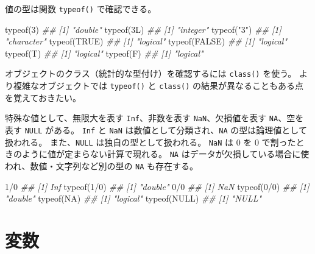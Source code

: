 \documentclass[
  letterpaper,
  xelatex,
  ja=standard, xelatex]{bxjsbook}
\newenvironment{Shaded}{\begin{snugshade}}{\end{snugshade}}
\newcommand{\ConstantTok}[1]{\textcolor[rgb]{0.56,0.35,0.01}{#1}}
\newcommand{\DecValTok}[1]{\textcolor[rgb]{0.68,0.00,0.00}{#1}}
\newcommand{\DocumentationTok}[1]{\textcolor[rgb]{0.37,0.37,0.37}{\textit{#1}}}
\newcommand{\FunctionTok}[1]{\textcolor[rgb]{0.28,0.35,0.67}{#1}}
\newcommand{\NormalTok}[1]{\textcolor[rgb]{0.00,0.23,0.31}{#1}}
\newcommand{\SpecialCharTok}[1]{\textcolor[rgb]{0.37,0.37,0.37}{#1}}
\newcommand{\StringTok}[1]{\textcolor[rgb]{0.13,0.47,0.30}{#1}}
\begin{document}
値の型は関数 \texttt{typeof()} で確認できる。

\begin{Shaded}
\begin{Highlighting}[]
\FunctionTok{typeof}\NormalTok{(}\DecValTok{3}\NormalTok{)}
\DocumentationTok{\#\# [1] "double"}
\FunctionTok{typeof}\NormalTok{(}\DecValTok{3}\NormalTok{L)}
\DocumentationTok{\#\# [1] "integer"}
\FunctionTok{typeof}\NormalTok{(}\StringTok{"3"}\NormalTok{)}
\DocumentationTok{\#\# [1] "character"}
\FunctionTok{typeof}\NormalTok{(}\ConstantTok{TRUE}\NormalTok{)}
\DocumentationTok{\#\# [1] "logical"}
\FunctionTok{typeof}\NormalTok{(}\ConstantTok{FALSE}\NormalTok{)}
\DocumentationTok{\#\# [1] "logical"}
\FunctionTok{typeof}\NormalTok{(T)}
\DocumentationTok{\#\# [1] "logical"}
\FunctionTok{typeof}\NormalTok{(F)}
\DocumentationTok{\#\# [1] "logical"}
\end{Highlighting}
\end{Shaded}

オブジェクトのクラス（統計的な型付け）を確認するには \texttt{class()}
を使う。 より複雑なオブジェクトでは \texttt{typeof()} と
\texttt{class()} の結果が異なることもある点を覚えておきたい。

特殊な値として、無限大を表す \texttt{Inf}、非数を表す
\texttt{NaN}、欠損値を表す \texttt{NA}、空を表す \texttt{NULL} がある。
\texttt{Inf} と \texttt{NaN} は数値として分類され、\texttt{NA}
の型は論理値として扱われる。 また、\texttt{NULL}
は独自の型として扱われる。 \texttt{NaN} は 0 を 0
で割ったときのように値が定まらない計算で現れる。 \texttt{NA}
はデータが欠損している場合に使われ、数値・文字列など別の型の \texttt{NA}
も存在する。

\begin{Shaded}
\begin{Highlighting}[]
\DecValTok{1}\SpecialCharTok{/}\DecValTok{0}
\DocumentationTok{\#\# [1] Inf}
\FunctionTok{typeof}\NormalTok{(}\DecValTok{1}\SpecialCharTok{/}\DecValTok{0}\NormalTok{)}
\DocumentationTok{\#\# [1] "double"}
\DecValTok{0}\SpecialCharTok{/}\DecValTok{0}
\DocumentationTok{\#\# [1] NaN}
\FunctionTok{typeof}\NormalTok{(}\DecValTok{0}\SpecialCharTok{/}\DecValTok{0}\NormalTok{)}
\DocumentationTok{\#\# [1] "double"}
\FunctionTok{typeof}\NormalTok{(}\ConstantTok{NA}\NormalTok{)}
\DocumentationTok{\#\# [1] "logical"}
\FunctionTok{typeof}\NormalTok{(}\ConstantTok{NULL}\NormalTok{)}
\DocumentationTok{\#\# [1] "NULL"}
\end{Highlighting}
\end{Shaded}

\section{変数}\label{ux5909ux6570}
\end{document}
